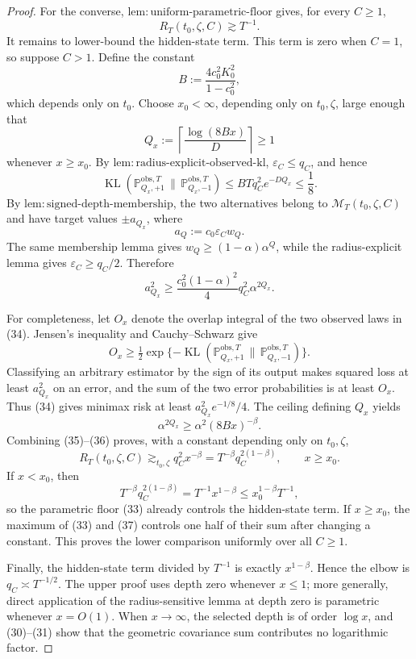 \documentclass{article}
\begin{document}
\begin{proof}
For the converse,
\(\mathrm{lem{:}uniform\text{-}parametric\text{-}floor}\) gives, for every \(C\ge1\),
\[
 R_T(t_0,\zeta,C)\gtrsim T^{-1}. \tag{33}
\]
It remains to lower-bound the hidden-state term.  This term is zero when
\(C=1\), so suppose \(C>1\).  Define the constant
\[
 B:=\frac{4c_0^2K_0^2}{1-c_0^2},
\]
which depends only on \(t_0\).  Choose \(x_0<\infty\), depending only on
\(t_0,\zeta\), large enough that
\[
 Q_x:=\left\lceil\frac{\log(8Bx)}D\right\rceil\ge1
\]
whenever \(x\ge x_0\).  By
\(\mathrm{lem{:}radius\text{-}explicit\text{-}observed\text{-}kl}\),
\(\varepsilon_C\le q_C\), and hence
\[
 \operatorname{KL}(\mathbb P_{Q_x,+1}^{\mathrm{obs},T}\,\|\,
                    \mathbb P_{Q_x,-1}^{\mathrm{obs},T})
 \le BTq_C^2e^{-DQ_x}\le\frac18. \tag{34}
\]
By \(\mathrm{lem{:}signed\text{-}depth\text{-}membership}\), the two alternatives
belong to \(\mathcal M_T(t_0,\zeta,C)\) and have target values \(\pm a_{Q_x}\),
where
\[
 a_Q:=c_0\varepsilon_Cw_Q.
\]
The same membership lemma gives \(w_Q\ge(1-\alpha)\alpha^Q\), while the
radius-explicit lemma gives \(\varepsilon_C\ge q_C/2\).  Therefore
\[
 a_{Q_x}^2
 \ge\frac{c_0^2(1-\alpha)^2}{4}q_C^2\alpha^{2Q_x}. \tag{35}
\]

For completeness, let \(O_x\) denote the overlap integral of the two observed
laws in (34).  Jensen's inequality and Cauchy--Schwarz give
\[
 O_x\ge\tfrac12\exp\{-\operatorname{KL}(\mathbb P_{Q_x,+1}^{\mathrm{obs},T}\,\|\,
                                             \mathbb P_{Q_x,-1}^{\mathrm{obs},T})\}.
\]
Classifying an arbitrary estimator by the sign of its output makes squared
loss at least \(a_{Q_x}^2\) on an error, and the sum of the two error
probabilities is at least \(O_x\).  Thus (34) gives minimax risk at least
\(a_{Q_x}^2e^{-1/8}/4\).  The ceiling defining \(Q_x\) yields
\[
 \alpha^{2Q_x}\ge\alpha^2(8Bx)^{-\beta}. \tag{36}
\]
Combining (35)--(36) proves, with a constant depending only on
\(t_0,\zeta\),
\[
 R_T(t_0,\zeta,C)
 \gtrsim_{t_0,\zeta}q_C^2x^{-\beta}
 =T^{-\beta}q_C^{2(1-\beta)},
 \qquad x\ge x_0. \tag{37}
\]
If \(x<x_0\), then
\[
 T^{-\beta}q_C^{2(1-\beta)}
 =T^{-1}x^{1-\beta}
 \le x_0^{1-\beta}T^{-1},
\]
so the parametric floor (33) already controls the hidden-state term.  If
\(x\ge x_0\), the maximum of (33) and (37) controls one half of their sum
after changing a constant.  This proves the lower comparison uniformly over
all \(C\ge1\).

Finally, the hidden-state term divided by \(T^{-1}\) is exactly
\(x^{1-\beta}\).  Hence the elbow is \(q_C\asymp T^{-1/2}\).  The upper proof
uses depth zero whenever \(x\le1\); more generally, direct application of the
radius-sensitive lemma at depth zero is parametric whenever \(x=O(1)\).
When \(x\to\infty\), the selected depth is of order \(\log x\), and
(30)--(31) show that the geometric covariance sum contributes no logarithmic
factor.
\end{proof}
\end{document}
